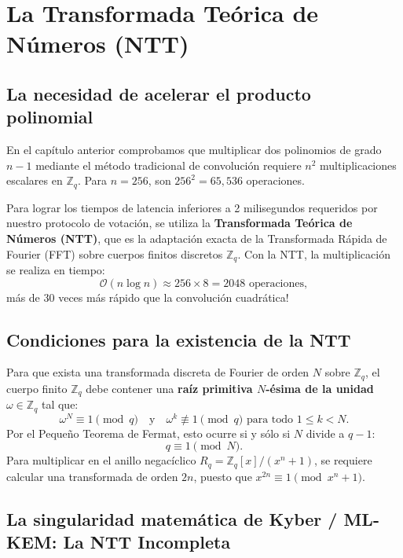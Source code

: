 \documentclass[11pt,a4paper,twoside,openright]{book}
\theoremstyle{plain}
\theoremstyle{definition}
\theoremstyle{remark}
\newcommand{\Zq}{\mathbb{Z}_q}
\newcommand{\Rq}{R_q}
\newcommand{\MLKEM}{\textsf{ML-KEM}}
\begin{document}
\chapter{La Transformada Te\'orica de N\'umeros (NTT)}
\label{chap:ntt}

\section{La necesidad de acelerar el producto polinomial}

En el cap\'itulo anterior comprobamos que multiplicar dos polinomios de grado $n-1$ mediante el m\'etodo tradicional de convoluci\'on requiere $n^2$ multiplicaciones escalares en $\Zq$. Para $n=256$, son $256^2 = 65,536$ operaciones.

Para lograr los tiempos de latencia inferiores a 2 milisegundos requeridos por nuestro protocolo de votaci\'on, se utiliza la \textbf{Transformada Te\'orica de N\'umeros (NTT)}, que es la adaptaci\'on exacta de la Transformada R\'apida de Fourier (FFT) sobre cuerpos finitos discretos $\Zq$. Con la NTT, la multiplicaci\'on se realiza en tiempo:
\[
  \mathcal{O}(n \log n) \approx 256 \times 8 = 2048 \text{ operaciones},
\]
\textexclamdown m\'as de 30 veces m\'as r\'apido que la convoluci\'on cuadr\'atica!

\section{Condiciones para la existencia de la NTT}

Para que exista una transformada discreta de Fourier de orden $N$ sobre $\Zq$, el cuerpo finito $\Zq$ debe contener una \textbf{ra\'iz primitiva $N$-\'esima de la unidad} $\omega \in \Zq$ tal que:
\[
  \omega^N \equiv 1 \pmod q \quad \text{y} \quad \omega^k \not\equiv 1 \pmod q \text{ para todo } 1 \leq k < N.
\]
Por el Peque\~no Teorema de Fermat, esto ocurre si y s\'olo si $N$ divide a $q-1$:
\[
  q \equiv 1 \pmod N.
\]
Para multiplicar en el anillo negac\'iclico $\Rq = \Zq[x]/(x^n + 1)$, se requiere calcular una transformada de orden $2n$, puesto que $x^{2n} \equiv 1 \pmod{x^n + 1}$.

\section{La singularidad matem\'atica de Kyber / \MLKEM{}: La NTT Incompleta}
\end{document}
